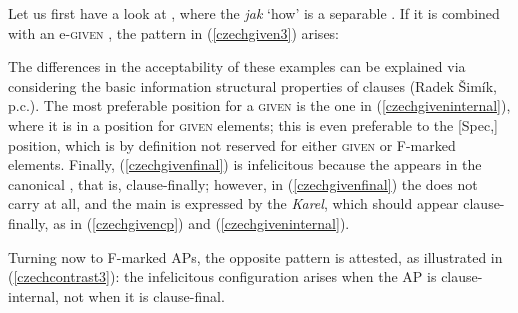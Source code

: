 Let us first have a look at , where the  \textit{jak} `how' is a separable  . If it is combined with an e-\textsc{given} , the pattern in (\ref{czechgiven3}) arises:

\ea \label{czechgiven3}
\z
\z
		
The differences in the acceptability of these examples can be explained via considering the basic information structural properties of  clauses (Radek Šimík, p.c.). The most preferable position for a \textsc{given}  is the one in (\ref{czechgiveninternal}), where it is in a position for \textsc{given} elements; this is even preferable to the [Spec,] position, which is by definition not reserved for either \textsc{given} or F-marked elements. Finally, (\ref{czechgivenfinal}) is infelicitous because the  appears in the canonical , that is, clause-finally; however, in (\ref{czechgivenfinal}) the  does not carry  at all, and the main  is expressed by the  \textit{Karel}, which should appear clause-finally, as in (\ref{czechgivencp}) and (\ref{czechgiveninternal}).

Turning now to F-marked APs, the opposite pattern is attested, as illustrated in (\ref{czechcontrast3}): the infelicitous configuration arises when the AP is clause-internal, not when it is clause-final.

\ea \label{czechcontrast3}
\z
\z

